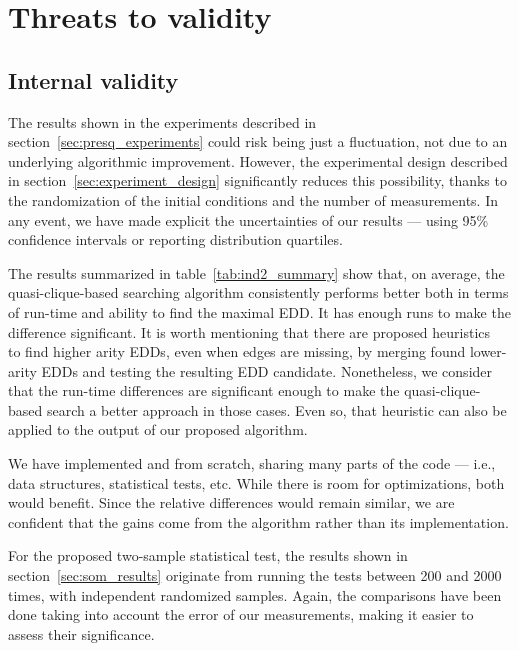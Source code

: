 \section{Threats to validity}
\label{sec:threats}

\subsection{Internal validity}

The \PresQ results shown in the experiments described in section~\ref{sec:presq_experiments}
could risk being just a fluctuation,
not due to an underlying algorithmic improvement. However,
the experimental design described in section~\ref{sec:experiment_design} significantly reduces
this possibility, thanks to the randomization of the initial conditions
and the number of measurements. In any event, we have made explicit the uncertainties
of our results --- using 95\% confidence intervals or reporting distribution quartiles.

The results summarized in table~\ref{tab:ind2_summary} show that, on average, the
quasi-clique-based searching algorithm consistently performs
better both in terms of run-time and ability to find the maximal \gls{EDD}.
It has enough runs to make the difference significant.
It is worth mentioning that there are proposed heuristics~\cite{koeller2003discovery} to find higher
arity \glspl{EDD}, even when edges are missing, by merging found lower-arity
\glspl{EDD} and testing the resulting \gls{EDD} candidate.
Nonetheless, we consider that the run-time differences are significant enough to make
the quasi-clique-based search a better approach in those cases.
Even so, that heuristic can also be applied to the output of our proposed algorithm.

We have implemented \Find and \PresQ from scratch, sharing 
many parts of the code --- i.e., data structures, statistical tests, etc.
While there is room for optimizations, both would benefit.
Since the relative differences would remain similar, we are confident that the gains come from the 
algorithm rather than its implementation.

\medskip

For the proposed two-sample statistical test, the results shown in
section~\ref{sec:som_results} originate from running the tests between 200 and 2000
times, with independent randomized samples.
Again, the comparisons have been done taking into account the error of our measurements,
making it easier to assess their significance.

